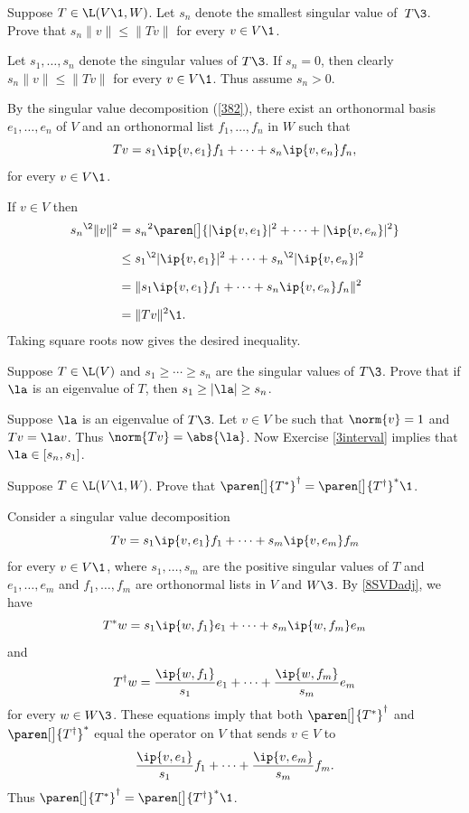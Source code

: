 \exercise
Suppose $T \in \L(V\1,W)$.  Let $s_n$ denote the smallest singular value of~$T\3$.
Prove that $s_n \| v \| \le \| Tv \|$ for every $v \in V\1$. \label{3smallSV}

\begin{Solution}
Let $s_1, \ldots, s_n$ denote the singular values of $T\3$. If $s_n = 0$, then clearly $s_n \| v \| \le \| Tv \|$
for every $v \in V\1$. Thus assume $s_n > 0$.

By the singular value decomposition (\ref{382}), there exist
an orthonormal basis $e_1, \dots, e_n$ of $V$ and an orthonormal list $f_1, \dots, f_n$ in $W$ such that
\[
Tv = s_1 \ip{v, e_1} f_1 + \dots + s_n \ip{v, e_n} f_n,
\]
for every $v \in V\1$.

If $v \in V$ then
\begin{align*}
{s_n}^{\2} \| v \|^2
&= {s_n}^2 \paren[\big]{|\ip{v, e_1}|^2 + \dots + |\ip{v, e_n}|^2} \\[6bp]
&\le {s_1}^{\2} |\ip{v, e_1}|^2 + \dots + {s_n}^{\2} |\ip{v, e_n}|^2 \\[6bp]
&= \|s_1 \ip{v, e_1} f_1 + \dots + s_n \ip{v, e_n} f_n \|^2 \\[6bp]
&= \|Tv\|^2\1.
\end{align*}
Taking square roots now gives the desired inequality.
\end{Solution}

\exercise
Suppose $T \in \L(V)$ and $s_1 \ge \cdots \ge s_n$ are the singular values of $T\3$.
Prove that if $\la$ is an eigenvalue of $T$, then $s_1  \ge |\la| \ge s_n$.

\begin{Solution}
Suppose $\la$ is an eigenvalue of $T\3$. Let $v \in V$ be such that $\norm{v} = 1$ and $Tv = \la v$. Thus $\norm{Tv} = \abs{\la}$. Now Exercise \ref{3interval} implies that $\la \in [s_n, s_1]$.
\end{Solution}

\exercise
Suppose $T \in \L(V\1, W)$. Prove that $\paren[\big]{T^*}^\dagger = \paren[\big]{T^\dagger}^*\1$.\label{7Tdagstar}

\begin{Solution}
Consider a singular value decomposition
\[
Tv = s_1 \ip{v, e_1} f_1 + \dots + s_m \ip{v, e_m} f_m
\]
for every $v \in V\1$, where $s_1, \dots, s_m$ are the positive singular values of $T$ and $e_1, \dots, e_m$ and $f_1, \dots, f_m$ are orthonormal lists in $V$ and $W\3$. By \ref{8SVDadj}, we have
\[
T^*w = s_1 \ip{w, f_1} e_1 + \dots + s_m \ip{w, f_m} e_m
\]
and
\[
T^\dagger w = \frac{\ip{w, f_1}}{s_1} e_1 + \dots + \frac{\ip{w, f_m}}{s_m} e_m
\]
for every $w \in W\3$. These equations imply that both $\paren[\big]{T^*}^\dagger$ and $\paren[\big]{T^\dagger}^*$ equal the operator on $V$ that sends $v \in V$ to
\[
\frac{\ip{v, e_1}}{s_1} f_1 + \cdots + \frac{\ip{v, e_m}}{s_m} f_m.
\]
Thus $\paren[\big]{T^*}^\dagger = \paren[\big]{T^\dagger}^*\1$.
\end{Solution}

